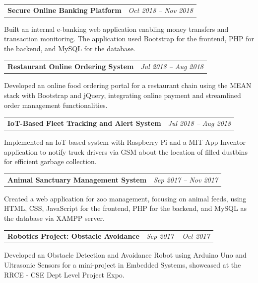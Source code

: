 \documentclass[letterpaper,10pt]{article}
\makeatletter
\newcommand{\projectEntry}[3]{
  \vspace{2pt}
  \noindent
  \begin{tabular*}{\textwidth}{@{\extracolsep{\fill}}lr}
    \textbf{#1} & \textit{#2} \\
  \end{tabular*}\vspace{-2pt}
  \noindent
  \parbox[t]{0.97\textwidth}{\footnotesize #3}
  \vspace{8pt}
}
\makeatother
\begin{document}
\projectEntry
  {Secure Online Banking Platform}
  {Oct 2018 -- Nov 2018}
  {Built an internal e-banking web application enabling money transfers and transaction monitoring. The application used Bootstrap for the frontend, PHP for the backend, and MySQL for the database.}

\projectEntry
  {Restaurant Online Ordering System}
  {Jul 2018 -- Aug 2018}
  {Developed an online food ordering portal for a restaurant chain using the MEAN stack with Bootstrap and jQuery, integrating online payment and streamlined order management functionalities.}

\projectEntry
  {IoT-Based Fleet Tracking and Alert System}
  {Jul 2018 -- Aug 2018}
  {Implemented an IoT-based system with Raspberry Pi and a MIT App Inventor application to notify truck drivers via GSM about the location of filled dustbins for efficient garbage collection.}

\projectEntry
  {Animal Sanctuary Management System}
  {Sep 2017 -- Nov 2017}
  {Created a web application for zoo management, focusing on animal feeds, using HTML, CSS, JavaScript for the frontend, PHP for the backend, and MySQL as the database via XAMPP server.}

\projectEntry
  {Robotics Project: Obstacle Avoidance}
  {Sep 2017 -- Oct 2017}
  {Developed an Obstacle Detection and Avoidance Robot using Arduino Uno and Ultrasonic Sensors for a mini-project in Embedded Systems, showcased at the RRCE - CSE Dept Level Project Expo.}

\end{document}
